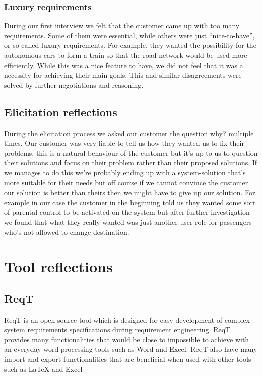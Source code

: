 \documentclass[10pt]{article}
\begin{document}
\subsubsection{Luxury requirements}
During our first interview we felt that the customer came up with too many requirements. Some of them were essential, while others were just “nice-to-have”, or so called luxury requirements. For example, they wanted the possibility for the autonomous cars to form a train so that the road network would be used more efficiently. While this was a nice feature to have, we did not feel that it was a necessity for achieving their main goals. This and similar disagreements were solved by further negotiations and reasoning. 

\subsection{Elicitation reflections}
During the elicitation process we asked our customer the question why? multiple times. Our customer was very liable to tell us how they wanted us to fix their problems, this is a natural behaviour of the customer but it's up to us to question their solutions and focus on their problem rather than their proposed solutions. If we manages to do this we're probably ending up with a system-solution that's more suitable for their needs but off course if we cannot convince the customer our solution is better than theirs then we might have to give up our solution.
For example in our case the customer in the beginning told us they wanted some sort of parental control to be activated on the system but after further investigation we found that what they really wanted was just another user role for passengers who's not allowed to change destination.

\section{Tool reflections}
\noindent
\subsection{ReqT}
ReqT is an open source tool which is designed for easy development of complex system requirements specifications during requirement engineering. ReqT provides many functionalities that would be close to impossible to achieve with an everyday word processing tools such as Word and Excel. ReqT also have many import and export functionalities that are beneficial when used with other tools such as LaTeX and Excel
\end{document}
